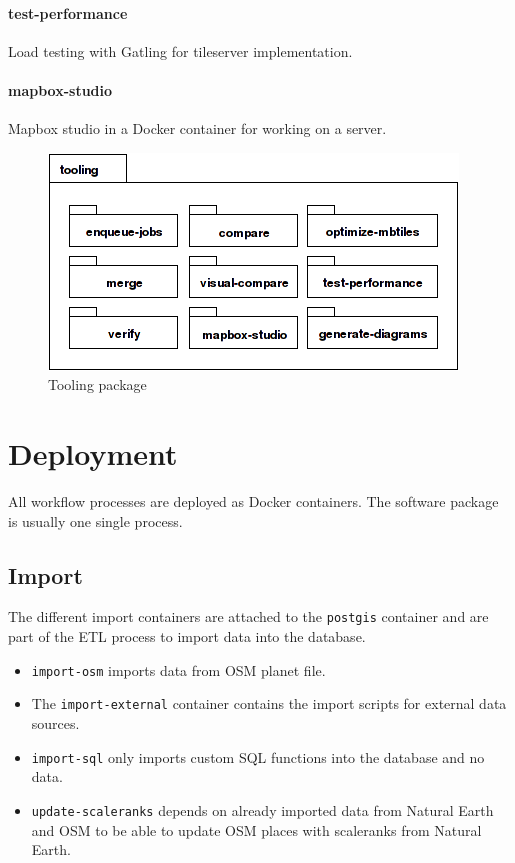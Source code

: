 \paragraph{test-performance}
Load testing with Gatling for tileserver implementation.

\paragraph{mapbox-studio}
Mapbox studio in a Docker container for working on a server.

\begin{figure}[H]
  \includegraphics[scale=0.6]{images/tooling_package_diagram.png}
  \caption{Tooling package}
\end{figure}

\newpage
\section{Deployment}\label{deployment}

All workflow processes are deployed as Docker containers. The software package
is usually one single process.

\subsection{Import}
The different import containers are attached to the \texttt{postgis} container and
are part of the ETL process to import data into the database.

\begin{itemize}
  \item \texttt{import-osm} imports data from OSM planet file.
  \item The \texttt{import-external} container contains the import scripts for external data sources.
  \item \texttt{import-sql} only imports custom SQL functions into the database and no data.
  \item \texttt{update-scaleranks} depends on already imported data from Natural Earth and OSM to be able to update OSM places with scaleranks from Natural Earth.
\end{itemize}

